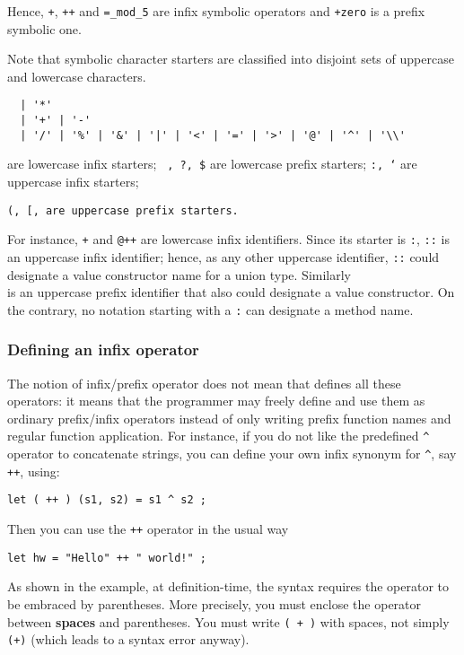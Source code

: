 Hence, {\tt +}, {\tt ++} and {\tt =\_mod\_5} are infix symbolic operators and
{\tt \tilde+zero} is a prefix symbolic one.

Note that symbolic character starters are classified into disjoint sets of uppercase
and lowercase characters.
\begin{verbatim}
  | '*'
  | '+' | '-'
  | '/' | '%' | '&' | '|' | '<' | '=' | '>' | '@' | '^' | '\\'
\end{verbatim}
are lowercase infix starters;
{\tt ~, ?, \$}
are lowercase prefix starters;
{\tt :, `}
are uppercase infix starters;
{\tt (, [, {}
are uppercase prefix starters.

For instance, {\tt +} and {\tt @++} are lowercase infix identifiers.
Since its starter is {\tt :}, {\tt ::} is an uppercase infix identifier; hence,
as any other uppercase identifier, {\tt ::} could designate a
value constructor name for a union type. Similarly {\tt \[\]} is an uppercase prefix identifier that also
could designate a value constructor.
On the contrary, no notation starting with a {\tt :} can designate a method name.

\subsubsection{Defining an infix operator}

The notion of infix/prefix operator does not mean that {\focal} defines all
these operators: it means that the programmer may freely define and use them
as ordinary prefix/infix operators instead of only writing prefix function
names and regular function application. For instance, if you do not like the
{\focal} predefined \verb"^" operator to concatenate strings, you can define your
own infix synonym for \verb"^", say {\tt ++}, using:

{\scriptsize
\begin{lstlisting}
let ( ++ ) (s1, s2) = s1 ^ s2 ;
\end{lstlisting}
}
Then you can use the {\tt ++} operator in the usual way
{\scriptsize
\begin{lstlisting}
let hw = "Hello" ++ " world!" ;
\end{lstlisting}
}

As shown in the example, at definition-time, the syntax requires
the operator to be embraced by parentheses. More precisely, you must
enclose the operator between {\bf spaces} and parentheses.
You must write {\tt ( + )} with spaces, not simply {\tt (+)} (which leads
to a syntax error anyway).

}
